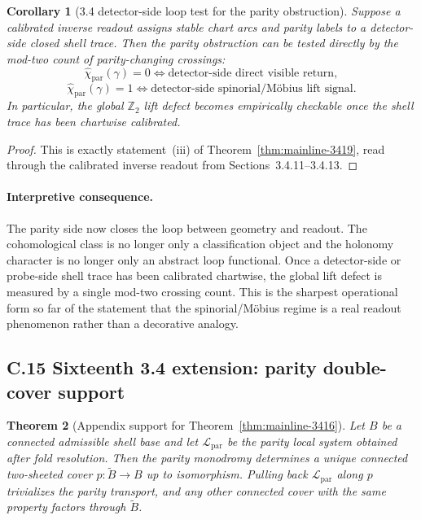 \documentclass[12pt,a4paper]{article}
\newtheorem{theorem}{Theorem}[section]
\newtheorem{corollary}[theorem]{Corollary}
\begin{document}
\begin{corollary}[3.4 detector-side loop test for the parity obstruction]
\label{cor:mainline-3419}
Suppose a calibrated inverse readout assigns stable chart arcs and parity labels to a detector-side closed shell trace. Then the parity obstruction can be tested directly by the mod-two count of parity-changing crossings:
\[
 \widehat\chi_{\mathrm{par}}(\gamma)=0
 \Longleftrightarrow
 \text{detector-side direct visible return},
\]
\[
 \widehat\chi_{\mathrm{par}}(\gamma)=1
 \Longleftrightarrow
 \text{detector-side spinorial/M\"obius lift signal}.
\]
In particular, the global $\mathbb Z_2$ lift defect becomes empirically checkable once the shell trace has been chartwise calibrated.
\end{corollary}

\begin{proof}
This is exactly statement~(iii) of Theorem~\ref{thm:mainline-3419}, read through the calibrated inverse readout from Sections~3.4.11--3.4.13.
\end{proof}

\paragraph{Interpretive consequence.}
The parity side now closes the loop between geometry and readout. The cohomological class is no longer only a classification object and the holonomy character is no longer only an abstract loop functional. Once a detector-side or probe-side shell trace has been calibrated chartwise, the global lift defect is measured by a single mod-two crossing count. This is the sharpest operational form so far of the statement that the spinorial/M\"obius regime is a real readout phenomenon rather than a decorative analogy.


\subsection*{C.15 Sixteenth 3.4 extension: parity double-cover support}

\begin{theorem}[Appendix support for Theorem~\ref{thm:mainline-3416}]
\label{thm:appendix-3416}
Let $B$ be a connected admissible shell base and let $\mathcal L_{\mathrm{par}}$ be the parity local system obtained after fold resolution. Then the parity monodromy determines a unique connected two-sheeted cover $p:\widetilde B\to B$ up to isomorphism. Pulling back $\mathcal L_{\mathrm{par}}$ along $p$ trivializes the parity transport, and any other connected cover with the same property factors through $\widetilde B$.
\end{theorem}
\end{document}
